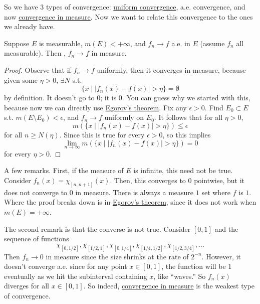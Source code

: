   So we have 3 types of convergence: \hyperref[real-def:uniform-convergence]{uniform convergence}, a.e. convergence, and now \hyperref[def:convergence-in-measure]{convergence in measure}. Now we want to relate this convergence to the ones we already have. 

  \begin{theorem}
    \label{thm:egorovs-theorem}
    Suppose $E$ is measurable, $m(E) < +\infty$, and $f_n \to f$ a.e. in $E$ (assume $f_n$ all measurable). Then , $f_n \to f$ in measure. 
  \end{theorem}
  \begin{proof}
    Observe that if $f_n \to f$ uniformly, then it converges in measure, because given some $\eta > 0$, $\exists N$ s.t. 
    \begin{equation}
      \{ x \mid |f_n (x) - f(x) | > \eta \} = \emptyset
    \end{equation}
    by definition. It doesn't go to $0$; it is $0$. You can guess why we started with this, because now we can directly use \hyperref[thm:egorovs-theorem]{Egorov's theorem}. Fix any $\epsilon > 0$. Find $E_0 \subset E$ s.t. $m (E \setminus E_0) < \epsilon$, and $f_n \to f$ uniformly on $E_0$. It follows that for all $\eta > 0$, 
    \begin{equation}
      m(\{x \mid |f_n (x) - f(x)| > \eta\}) \leq \epsilon 
    \end{equation}
    for all $n \geq N(\eta)$. Since this is true for every $\epsilon > 0$, so this implies
    \begin{equation}
      \lim_{n \to \infty} m(\{ x \mid |f_n (x) - f(x)| > \eta\}) = 0
    \end{equation} 
    for every $\eta > 0$. 
  \end{proof}

  A few remarks. First, if the measure of $E$ is infinite, this need not be true. Consider $f_n (x) = \chi_{[n, n+1]} (x)$. Then, this converges to $0$ pointwise, but it does not converge to $0$ in measure. There is always a measure $1$ set where $f$ is $1$. Where the proof breaks down is in \hyperref[thm:egorovs-theorem]{Egorov's theorem}, since it does not work when $m(E) = +\infty$. 

  The second remark is that the converse is not true. Consider $[0, 1]$ and the sequence of functions 
  \begin{equation}
    \chi_{[0, 1/2]}, \chi_{[1/2, 1]}, \chi_{[0, 1/4]}, \chi_{[1/4, 1/2]}, \chi_{[1/2, 3/4]}, \ldots 
  \end{equation}
  Then $f_n \to 0$ in measure since the size shrinks at the rate of $2^{-n}$. However, it doesn't converge a.e. since for any point $x \in [0, 1]$, the function will be $1$ eventually as we hit the subinterval containing $x$, like ``waves.'' So $f_n(x)$ diverges for all $x \in [0, 1]$. So indeed, \hyperref[def:convergence-in-measure]{convergence in measure} is the weakest type of convergence. 

